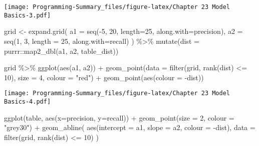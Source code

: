 \documentclass[
]{article}
\newenvironment{Shaded}{\begin{snugshade}}{\end{snugshade}}
\newcommand{\AttributeTok}[1]{\textcolor[rgb]{0.77,0.63,0.00}{#1}}
\newcommand{\DecValTok}[1]{\textcolor[rgb]{0.00,0.00,0.81}{#1}}
\newcommand{\FunctionTok}[1]{\textcolor[rgb]{0.00,0.00,0.00}{#1}}
\newcommand{\NormalTok}[1]{#1}
\newcommand{\OtherTok}[1]{\textcolor[rgb]{0.56,0.35,0.01}{#1}}
\newcommand{\SpecialCharTok}[1]{\textcolor[rgb]{0.00,0.00,0.00}{#1}}
\newcommand{\StringTok}[1]{\textcolor[rgb]{0.31,0.60,0.02}{#1}}
\begin{document}
\texttt{[image: Programming-Summary\_files/figure-latex/Chapter 23 Model Basics-3.pdf]}

\begin{Shaded}
\begin{Highlighting}[]
\NormalTok{grid }\OtherTok{\textless{}{-}} \FunctionTok{expand.grid}\NormalTok{(}
  \AttributeTok{a1 =} \FunctionTok{seq}\NormalTok{(}\SpecialCharTok{{-}}\DecValTok{5}\NormalTok{, }\DecValTok{20}\NormalTok{, }\AttributeTok{length=}\DecValTok{25}\NormalTok{, }\AttributeTok{along.with=}\NormalTok{precision),}
  \AttributeTok{a2 =} \FunctionTok{seq}\NormalTok{(}\DecValTok{1}\NormalTok{, }\DecValTok{3}\NormalTok{, }\AttributeTok{length =} \DecValTok{25}\NormalTok{, }\AttributeTok{along.with=}\NormalTok{recall)}
\NormalTok{) }\SpecialCharTok{\%\textgreater{}\%} 
  \FunctionTok{mutate}\NormalTok{(}\AttributeTok{dist =}\NormalTok{ purrr}\SpecialCharTok{::}\FunctionTok{map2\_dbl}\NormalTok{(a1, a2, table\_dist))}

\NormalTok{grid }\SpecialCharTok{\%\textgreater{}\%} 
  \FunctionTok{ggplot}\NormalTok{(}\FunctionTok{aes}\NormalTok{(a1, a2)) }\SpecialCharTok{+}
  \FunctionTok{geom\_point}\NormalTok{(}\AttributeTok{data =} \FunctionTok{filter}\NormalTok{(grid, }\FunctionTok{rank}\NormalTok{(dist) }\SpecialCharTok{\textless{}=} \DecValTok{10}\NormalTok{), }\AttributeTok{size =} \DecValTok{4}\NormalTok{, }\AttributeTok{colour =} \StringTok{"red"}\NormalTok{) }\SpecialCharTok{+}
  \FunctionTok{geom\_point}\NormalTok{(}\FunctionTok{aes}\NormalTok{(}\AttributeTok{colour =} \SpecialCharTok{{-}}\NormalTok{dist)) }
\end{Highlighting}
\end{Shaded}

\texttt{[image: Programming-Summary\_files/figure-latex/Chapter 23 Model Basics-4.pdf]}

\begin{Shaded}
\begin{Highlighting}[]
\FunctionTok{ggplot}\NormalTok{(table, }\FunctionTok{aes}\NormalTok{(}\AttributeTok{x=}\NormalTok{precision, }\AttributeTok{y=}\NormalTok{recall)) }\SpecialCharTok{+} 
  \FunctionTok{geom\_point}\NormalTok{(}\AttributeTok{size =} \DecValTok{2}\NormalTok{, }\AttributeTok{colour =} \StringTok{"grey30"}\NormalTok{) }\SpecialCharTok{+} 
  \FunctionTok{geom\_abline}\NormalTok{(}
    \FunctionTok{aes}\NormalTok{(}\AttributeTok{intercept =}\NormalTok{ a1, }\AttributeTok{slope =}\NormalTok{ a2, }\AttributeTok{colour =} \SpecialCharTok{{-}}\NormalTok{dist), }
    \AttributeTok{data =} \FunctionTok{filter}\NormalTok{(grid, }\FunctionTok{rank}\NormalTok{(dist) }\SpecialCharTok{\textless{}=} \DecValTok{10}\NormalTok{)}
\NormalTok{  )}
\end{Highlighting}
\end{Shaded}
\end{document}
